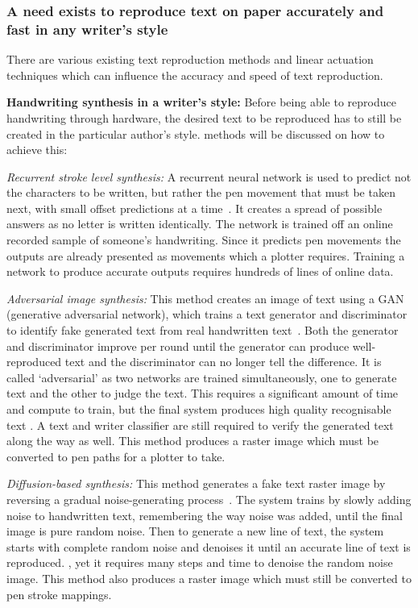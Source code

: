 \subsubsection{A need exists to reproduce text on paper accurately and fast in any writer's style}
\label{sec:lit-synth}

There are various existing text reproduction methods and linear actuation techniques which can influence the accuracy and speed of text reproduction.

\textbf{Handwriting synthesis in a writer's style:} Before being able to reproduce handwriting through hardware, the desired text to be reproduced has to still be created in the particular author's style.  methods will be discussed on how to achieve this:

\emph{Recurrent stroke level synthesis:} A recurrent neural network is used to predict not the characters to be written, but rather the pen movement that must be taken next, with small offset predictions at a time~\cite[p.~1]{graves2013}. It creates a spread of possible answers as no letter is written identically. The network is trained off an online recorded sample of someone's handwriting. Since it predicts pen movements the outputs are already presented as movements which a plotter requires. Training a network to produce accurate outputs requires hundreds of lines of online data.

\emph{Adversarial image synthesis:} This method creates an image of text using a GAN (generative adversarial network), which trains a text generator and discriminator to identify fake generated text from real handwritten text~\cite[p.~273]{kang2020}. Both the generator and discriminator improve per round until the generator can produce well-reproduced text and the discriminator can no longer tell the difference. It is called `adversarial' as two networks are trained simultaneously, one to generate text and the other to judge the text. This requires a significant amount of time and compute to train, but the final system produces high quality recognisable text . A text and writer classifier are still required to verify the generated text along the way as well. This method produces a raster image which must be converted to pen paths for a plotter to take.

\emph{Diffusion-based synthesis:} This method generates a fake text raster image by reversing a gradual noise-generating process~\cite[Sec.~1]{dai2024}. The system trains by slowly adding noise to handwritten text, remembering the way noise was added, until the final image is pure random noise. Then to generate a new line of text, the system starts with complete random noise and denoises it until an accurate line of text is reproduced. , yet it requires many steps and time to denoise the random noise image. This method also produces a raster image which must still be converted to pen stroke mappings.


